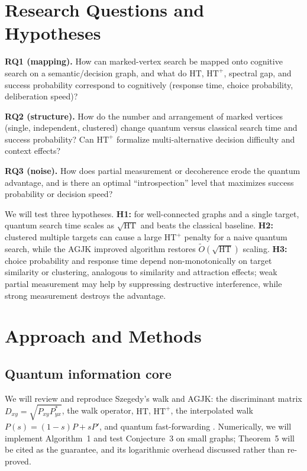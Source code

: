 \documentclass[10pt]{article}
\newcommand{\HT}{\mathrm{HT}}
\newcommand{\HTp}{\mathrm{HT}^{+}}
\newcommand{\Otil}{\widetilde{O}}
\begin{document}
\section{Research Questions and Hypotheses}

\textbf{RQ1 (mapping).} How can marked-vertex search be mapped onto cognitive search on a semantic/decision graph, and what do $\HT$, $\HTp$, spectral gap, and success probability correspond to cognitively (response time, choice probability, deliberation speed)?

\textbf{RQ2 (structure).} How do the number and arrangement of marked vertices (single, independent, clustered) change quantum versus classical search time and success probability? Can $\HTp$ formalize multi-alternative decision difficulty and context effects?

\textbf{RQ3 (noise).} How does partial measurement or decoherence erode the quantum advantage, and is there an optimal ``introspection'' level that maximizes success probability or decision speed?

We will test three hypotheses. \textbf{H1:} for well-connected graphs and a single target, quantum search time scales as $\sqrt{\HT}$ and beats the classical baseline. \textbf{H2:} clustered multiple targets can cause a large $\HTp$ penalty for a naive quantum search, while the AGJK improved algorithm restores $\Otil(\sqrt{\HT})$ scaling. \textbf{H3:} choice probability and response time depend non-monotonically on target similarity or clustering, analogous to similarity and attraction effects; weak partial measurement may help by suppressing destructive interference, while strong measurement destroys the advantage.

\section{Approach and Methods}

\subsection{Quantum information core}
We will review and reproduce Szegedy's walk and AGJK: the discriminant matrix $D_{xy}=\sqrt{P_{xy}P^{*}_{yx}}$, the walk operator, $\HT$, $\HTp$, the interpolated walk $P(s)=(1-s)P+sP'$, and quantum fast-forwarding \cite{agjk2019}. Numerically, we will implement Algorithm~1 and test Conjecture~3 on small graphs; Theorem~5 will be cited as the guarantee, and its logarithmic overhead discussed rather than re-proved.
\end{document}
